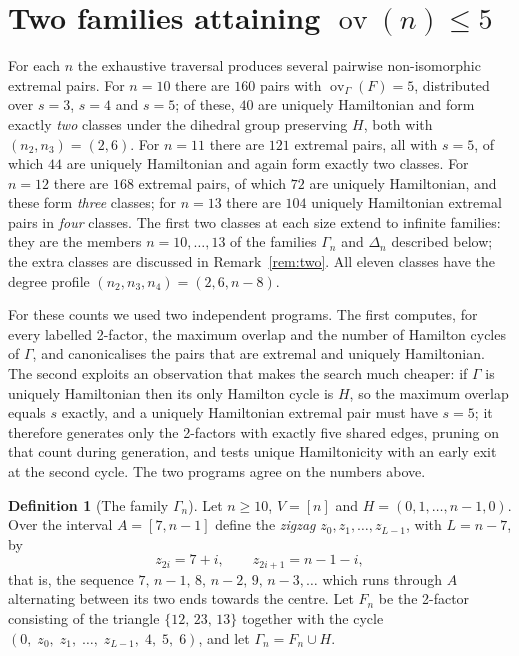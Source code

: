 \documentclass[11pt,a4paper]{article}
\theoremstyle{definition}
\newtheorem{definition}[theorem]{Definition}
\theoremstyle{remark}
\newcommand{\ov}{\operatorname{ov}}
\begin{document}
\section{Two families attaining \texorpdfstring{$\ov(n)\le5$}{ov(n) <= 5}}\label{sec:family}

For each $n$ the exhaustive traversal produces several pairwise non-isomorphic extremal pairs. For $n=10$ there are $160$ pairs with $\ov_\Gamma(F)=5$, distributed over $s=3$, $s=4$ and $s=5$; of these, $40$ are uniquely Hamiltonian and form exactly \emph{two} classes under the dihedral group preserving $H$, both with $(n_2,n_3)=(2,6)$. For $n=11$ there are $121$ extremal pairs, all with $s=5$, of which $44$ are uniquely Hamiltonian and again form exactly two classes. For $n=12$ there are $168$ extremal pairs, of which $72$ are uniquely Hamiltonian, and these form \emph{three} classes; for $n=13$ there are $104$ uniquely Hamiltonian extremal pairs in \emph{four} classes. The first two classes at each size extend to infinite families: they are the members $n=10,\dots,13$ of the families $\Gamma_n$ and $\Delta_n$ described below; the extra classes are discussed in Remark~\ref{rem:two}. All eleven classes have the degree profile $(n_2,n_3,n_4)=(2,6,n-8)$.

For these counts we used two independent programs. The first computes, for every labelled 2-factor, the maximum overlap and the number of Hamilton cycles of $\Gamma$, and canonicalises the pairs that are extremal and uniquely Hamiltonian. The second exploits an observation that makes the search much cheaper: if $\Gamma$ is uniquely Hamiltonian then its only Hamilton cycle is $H$, so the maximum overlap equals $s$ exactly, and a uniquely Hamiltonian extremal pair must have $s=5$; it therefore generates only the 2-factors with exactly five shared edges, pruning on that count during generation, and tests unique Hamiltonicity with an early exit at the second cycle. The two programs agree on the numbers above.

\begin{definition}[The family $\Gamma_n$]\label{def:gamma}
Let $n\ge10$, $V=[n]$ and $H=(0,1,\dots,n-1,0)$. Over the interval $A=[7,n-1]$ define the \emph{zigzag} $z_0,z_1,\dots,z_{L-1}$, with $L=n-7$, by
\[
z_{2i}=7+i,\qquad z_{2i+1}=n-1-i ,
\]
that is, the sequence $7,\,n-1,\,8,\,n-2,\,9,\,n-3,\dots$ which runs through $A$ alternating between its two ends towards the centre. Let $F_n$ be the 2-factor consisting of the triangle $\{12,\,23,\,13\}$ together with the cycle $(0,\;z_0,\;z_1,\;\dots,\;z_{L-1},\;4,\;5,\;6)$, and let $\Gamma_n=F_n\cup H$.
\end{definition}
\end{document}
